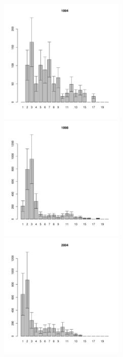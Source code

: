 \begin{figure}[h]
\begin{multicols}{3}
\hfill
\includegraphics[width=60mm]{../White_Sea/Luvenga_II_razrez/fucus_zone_1994_.pdf}
\hfill
\includegraphics[width=60mm]{../White_Sea/Luvenga_II_razrez/fucus_zone_1998_.pdf}
\hfill
\includegraphics[width=60mm]{../White_Sea/Luvenga_II_razrez/fucus_zone_2004_.pdf}
\end{multicols}



\end{figure}
